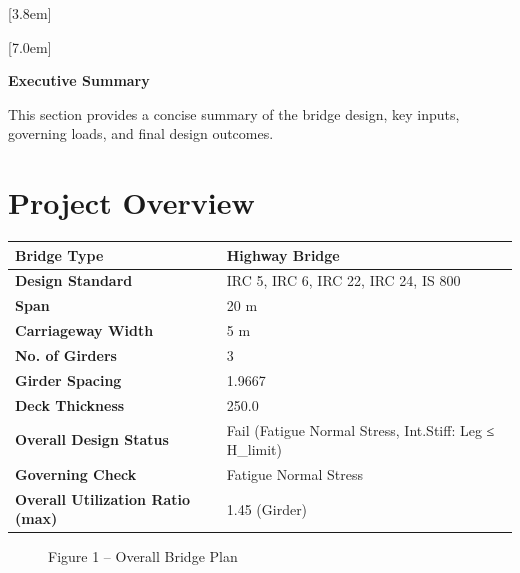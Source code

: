 \documentclass[12pt,a4paper]{report}
\numberwithin{table}{chapter}
\numberwithin{figure}{chapter}
\begin{document}
[3.8em]
  {\normalfont}
  {\contentslabel{2.3em}}
  {\hspace*{-2.3em}}
  {\hfill\contentspage}

[7.0em]
  {\normalfont}
  {\contentslabel{3.2em}}
  {\hspace*{-3.2em}}
  {\hfill\contentspage}

\newpage
\renewcommand{\contentsname}{\centering\Large\bfseries Table of Contents}
\tableofcontents


\newpage
{\centering\Large\bfseries Executive Summary\par}
\vspace{0.8em}

This section provides a concise summary of the bridge design, key inputs, governing loads, and final design outcomes.

\section*{Project Overview}
\label{sec:project-overview}


\begin{tabular}{|L{5.5cm}|L{8.5cm}|}
\hline
\textbf{Bridge Type} & Highway Bridge \\
\hline
\textbf{Design Standard} & IRC 5, IRC 6, IRC 22, IRC 24, IS 800 \\
\hline
\textbf{Span} & 20 m \\
\hline
\textbf{Carriageway Width} & 5 m \\
\hline
\textbf{No. of Girders} & 3 \\
\hline
\textbf{Girder Spacing} & 1.9667 \\
\hline
\textbf{Deck Thickness} & 250.0 \\
\hline
\textbf{Overall Design Status} & Fail (Fatigue Normal Stress, Int.Stiff:\allowbreak{} Leg ≤ H\_\allowbreak{}limit) \\
\hline
\textbf{Governing Check} & Fatigue Normal Stress \\
\hline
\textbf{Overall Utilization Ratio (max)} & 1.45 (Girder) \\
\hline
\end{tabular}


\begin{figure}[H]
\centering
{}
\caption*{Figure 1 -- Overall Bridge Plan}
\end{figure}
\end{document}
